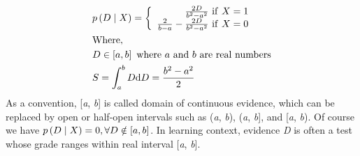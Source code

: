 \documentclass{article}
\numberwithin{equation}{section}
\numberwithin{figure}{section}
\numberwithin{table}{section}
\begin{document}
\begin{equation}
\begin{split}
&p\left(D\mathrel{\left|\vphantom{D X}\right.\kern-\nulldelimiterspace}X\right)=\left\{ \begin{array}{r}
\frac{2D}{b^2-a^2}\ \mathrm{if}\ X=1 \\ 
\frac{2}{b-a}-\frac{2D}{b^2-a^2}\ \mathrm{if}\ X=0 \end{array}
\right.\\
&\mathrm{Where,}\\
&D\in \left[a,b\right]\ \mathrm{where}\ a\ \mathrm{and}\ b\ \mathrm{are\ real\ numbers}\\
&S=\int^b_a{D\mathrm{d}D}=\frac{b^2-a^2}{2}
\end{split}
\label{formula:cpt-continuous-evidence}
\end{equation}
As a convention, [\textit{a}, \textit{b}] is called domain of continuous evidence, which can be replaced by open or half-open intervals such as (\textit{a}, \textit{b}), (\textit{a}, \textit{b}], and [\textit{a}, \textit{b}). Of course we have $p\left(D\mathrel{\left|\vphantom{D X}\right.\kern-\nulldelimiterspace}X\right)=0,\forall D\notin \left[a,b\right]$. In learning context, evidence \textit{D} is often a test whose grade ranges within real interval [\textit{a}, \textit{b}].
\end{document}
